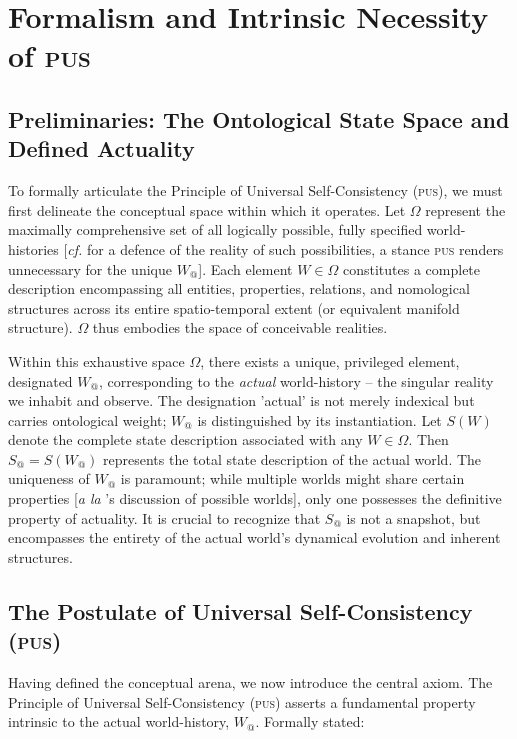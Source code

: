 \documentclass[11pt, a4paper]{article}
\makeatletter
\newcommand{\pus}{\textsc{pus}} %
\newcommand{\Wactual}{W_{@}} %
\newcommand{\Sactual}{S_{@}} %
\newcommand{\Omegaset}{\Omega} %
\makeatother
\begin{document}
\FloatBarrier

\section{Formalism and Intrinsic Necessity of \pus}

\subsection{Preliminaries: The Ontological State Space and Defined Actuality}
To formally articulate the Principle of Universal Self-Consistency (\pus), we must first delineate the conceptual space within which it operates. Let $\Omegaset$ represent the maximally comprehensive set of all logically possible, fully specified world-histories [\textit{cf.} \citealp{lewis1986} for a defence of the reality of such possibilities, a stance \pus{} renders unnecessary for the unique $\Wactual$]. Each element $W \in \Omegaset$ constitutes a complete description encompassing all entities, properties, relations, and nomological structures across its entire spatio-temporal extent (or equivalent manifold structure). $\Omegaset$ thus embodies the space of conceivable realities.

Within this exhaustive space $\Omegaset$, there exists a unique, privileged element, designated $\Wactual$, corresponding to the \textit{actual} world-history – the singular reality we inhabit and observe. The designation 'actual' is not merely indexical but carries ontological weight; $\Wactual$ is distinguished by its instantiation. Let $S(W)$ denote the complete state description associated with any $W \in \Omegaset$. Then $\Sactual = S(\Wactual)$ represents the total state description of the actual world. The uniqueness of $\Wactual$ is paramount; while multiple worlds might share certain properties [\textit{a la} \citealp{kripke1980}'s discussion of possible worlds], only one possesses the definitive property of actuality. It is crucial to recognize that $\Sactual$ is not a snapshot, but encompasses the entirety of the actual world's dynamical evolution and inherent structures.

\subsection{The Postulate of Universal Self-Consistency (\pus)}
Having defined the conceptual arena, we now introduce the central axiom. The Principle of Universal Self-Consistency (\pus) asserts a fundamental property intrinsic to the actual world-history, $\Wactual$. Formally stated:
\end{document}
